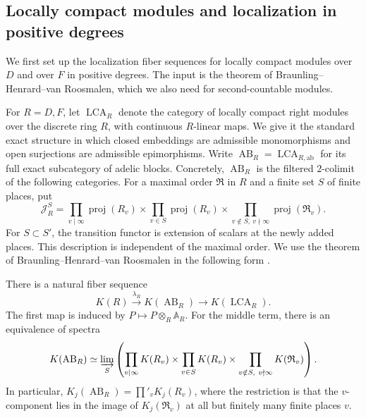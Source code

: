 \subsection{Locally compact modules and localization in positive degrees}
\label{subsec:paper-lca-localization}
We first set up the localization fiber sequences for locally compact modules over $D$ and over $F$ in positive degrees.
The input is the theorem of Braunling--Henrard--van Roosmalen, which we also need for second-countable modules.

For $R=D,F$, let $\operatorname{LCA}_R$ denote the category of locally compact right modules over the discrete ring $R$, with continuous $R$-linear maps.
We give it the standard exact structure in which closed embeddings are admissible monomorphisms and open surjections are admissible epimorphisms.
Write $\operatorname{AB}_R=\operatorname{LCA}_{R,\mathrm{ab}}$ for its full exact subcategory of adelic blocks.
Concretely, $\operatorname{AB}_R$ is the filtered $2$-colimit of the following categories.
For a maximal order $\mathfrak R$ in $R$ and a finite set $S$ of finite places, put
\[
 \mathcal J_R^S=
 \prod_{v\mid\infty}\operatorname{proj}(R_v)
 \times\prod_{v\in S}\operatorname{proj}(R_v)
 \times\prod_{v\notin S,\ v\nmid\infty}
                       \operatorname{proj}(\mathfrak R_v).
\]
For $S\subset S'$, the transition functor is extension of scalars at the newly added places.
This description is independent of the maximal order.
We use the theorem of Braunling--Henrard--van Roosmalen in the following form \cite[Definition 4.3, Proposition 4.5, Theorems 6.1, 6.2 and 6.13]{BHRAdeles}.

\begin{theorem}\label{thm:paper-lca-source}
There is a natural fiber sequence
\begin{equation}\label{eq:paper-lca-bhr}
 K(R)\xrightarrow{\lambda_R}K(\operatorname{AB}_R)
       \longrightarrow K(\operatorname{LCA}_R).
\end{equation}
The first map is induced by $P\mapsto P\otimes_R\mathbb A_R$.
For the middle term, there is an equivalence of spectra
\begin{equation}\label{eq:paper-lca-restricted-spectrum}
 K(\operatorname{AB}_R)\simeq
 \varinjlim_S\left(
 \prod_{v\mid\infty}K(R_v)\times\prod_{v\in S}K(R_v)
 \times\prod_{v\notin S,\ v\nmid\infty}K(\mathfrak R_v)\right).
\end{equation}
In particular, $K_j(\operatorname{AB}_R)=\prod'_vK_j(R_v)$, where the restriction is that the $v$-component lies in the image of $K_j(\mathfrak R_v)$ at all but finitely many finite places $v$.
\end{theorem}

